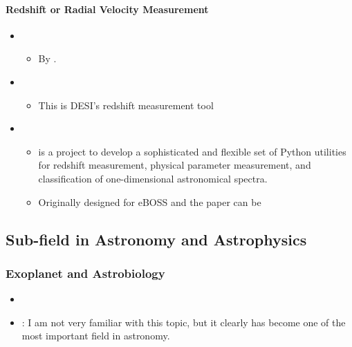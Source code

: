 \documentclass[letterpaper,10pt,english]{sphinxmanual}
\begin{document}
\paragraph{Redshift or Radial Velocity Measurement}
\label{\detokenize{resource/astro/topics/spectroscopy:redshift-or-radial-velocity-measurement}}\begin{itemize}
\item {} 
\begin{itemize}
\item {} 
By .

\end{itemize}

\item {} 
\begin{itemize}
\item {} 
This is DESI’s redshift measurement tool

\end{itemize}

\item {} 
\begin{itemize}
\item {} 
 is a project to develop a sophisticated and
flexible set of Python utilities for redshift measurement,
physical parameter measurement, and classification of
one-dimensional astronomical spectra.

\item {} 
Originally designed for eBOSS and the paper can be 

\end{itemize}

\end{itemize}


\subsection{Sub-field in Astronomy and Astrophysics}
\label{\detokenize{astro_topic:sub-field-in-astronomy-and-astrophysics}}

\subsubsection{Exoplanet and Astrobiology}
\label{\detokenize{resource/astro/topics/exoplanet:exoplanet-and-astrobiology}}\label{\detokenize{resource/astro/topics/exoplanet::doc}}\begin{itemize}
\item {} 

\item {} 
: I am not very familiar with this topic, but it
clearly has become one of the most important field in astronomy.

\end{itemize}
\end{document}
